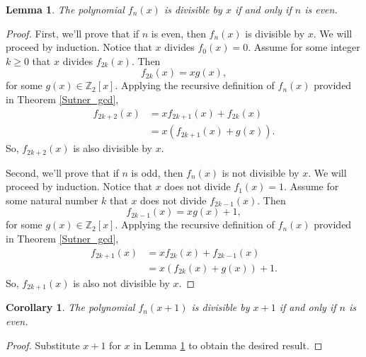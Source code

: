 \documentclass[a4paper]{article}
\newtheorem{lemma}{Lemma}
\newtheorem{corollary}{Corollary}
\newcommand{\Z}{\mathbb{Z}}
\begin{document}
	\begin{lemma}\label{x-divides-even}
		The polynomial $f_n(x)$ is divisible by $x$ if and only if $n$ is even.
	\end{lemma}
	\begin{proof}
		First, we'll prove that if $n$ is even, then $f_n(x)$ is divisible by $x$.
		We will proceed by induction.
		Notice that $x$ divides $f_0(x) = 0$.
		Assume for some integer $k \geq 0$ that $x$ divides $f_{2k}(x)$.
		Then
		\begin{equation*}
			f_{2k}(x) = x g(x),
		\end{equation*}
		for some $g(x) \in \Z_2[x]$.
		Applying the recursive definition of $f_n(x)$ provided in Theorem \ref{Sutner_gcd},
		\begin{align*}
			f_{2k+2}(x) &= xf_{2k+1}(x) + f_{2k}(x) \\
				&= x\left(f_{2k+1}(x) + g(x)\right).
		\end{align*}
		So, $f_{2k+2}(x)$ is also divisible by $x$.

		Second, we'll prove that if $n$ is odd, then $f_n(x)$ is not divisible by $x$.
		We will proceed by induction.
		Notice that $x$ does not divide $f_1(x) = 1$.
		Assume for some natural number $k$ that $x$ does not divide $f_{2k-1}(x)$.
		Then
		\begin{equation*}
			f_{2k-1}(x) = x g(x) + 1,
		\end{equation*}
		for some $g(x) \in \Z_2[x]$.
		Applying the recursive definition of $f_n(x)$ provided in Theorem \ref{Sutner_gcd},
		\begin{align*}
			f_{2k+1}(x) &= xf_{2k}(x) + f_{2k-1}(x) \\
				&= x\left(f_{2k}(x) + g(x)\right) + 1.
		\end{align*}
		So, $f_{2k+1}(x)$ is also not divisible by $x$.
	\end{proof}

	\begin{corollary}\label{x-plus1-divides-even}
		The polynomial $f_n(x+1)$ is divisible by $x+1$ if and only if $n$ is even.
	\end{corollary}
	\begin{proof}
		Substitute $x+1$ for $x$ in Lemma \ref{x-divides-even} to obtain the desired result.
	\end{proof}
\end{document}
